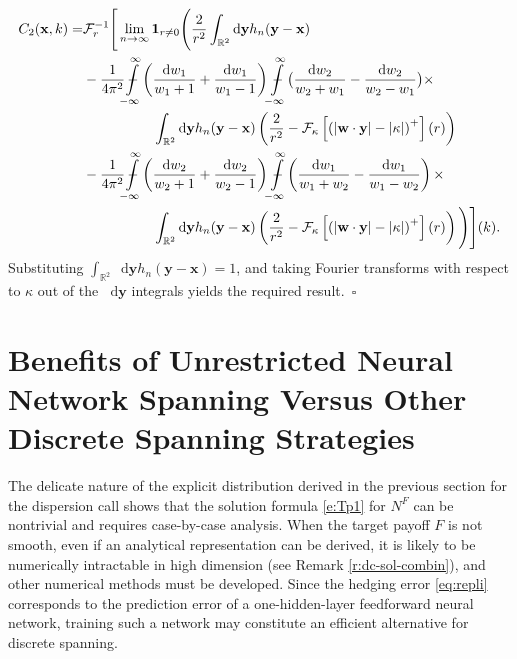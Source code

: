 \documentclass[11pt,A4,twoside]{article}
\numberwithin{equation}{section}
\renewcommand{\b}[1]{{\color{blue}#1}}
\newcommand{\intcl}{\!\!\Phint{\ \,-}\limits_{-\infty}^\infty\!}
\newcommand{\F}{\mathcal{F}}
\newcommand{\Fi}{\mathcal{F}^{-1}}
\renewcommand*\d{\mathop{}\!\mathrm{d}}
\newcommand{\x}{\mathbf{x}}
\newcommand{\y}{\mathbf{y}}
\newcommand{\w}{\mathbf{w}}
\newcommand{\R}{\mathbbm{R}}
\def\Phint#1{\mathchoice
  {\XXint\displaystyle\textstyle{#1}}%
  {\XXint\textstyle\scriptstyle{#1}}%
  {\XXint\scriptstyle\scriptscriptstyle{#1}}%
  {\XXint\scriptscriptstyle\scriptscriptstyle{#1}}%
  \!\int}
\def\XXint#1#2#3{{\setbox0=\hbox{$#1{#2#3}{\int}$}
    \vcenter{\hbox{$#2#3$}}\kern-.5\wd0}}
\def\qqq{\;\;\;\;\;\;\;\;\;}
\theoremstyle{definition}
\theoremstyle{remark}
\def\R{\mathbb{R}}
\def\finproof {$\Box$ \vskip 5 pt }\def\finproof{\rule{4pt}{6pt}}\def\finproof{\ensuremath{\square}}
\begin{document}
\begin{align*}
     C_2(\x,k) =& \Fi_r\Bigg[\lim_{n\to\infty}\mathbf{1}_{r\neq 0}\Bigg( \frac2{r^2}\int_{\R^2} \d\y h_n(\y-\x)
     \\
         &- \frac{1}{4\pi^2}\intcl \left(\frac{\d w_1}{ w_1+1}+\frac{\d w_1}{ w_1-1}\right)\intcl \big(\frac{\d w_2}{ w_2+w_1}-\frac{\d w_2}{ w_2-w_1}\big)\times\\
         &\qqq\qqq \int_{\R^2} \d\y h_n(\y-\x)\left(\frac2{r^2} - \F_\kappa\left[ \left( |\w\cdot\y| - |\kappa|\right)^+ \right](r) \right)
        \\
        &- \frac1{4\pi^2} \intcl \left(\frac{\d w_2}{ w_2+1}+\frac{\d w_2}{ w_2-1}\right)\intcl \left(\frac{\d w_1}{ w_1+w_2}-\frac{\d w_1}{ w_1-w_2}\right)\times\\
         &\qqq\qqq\int_{\R^2} \d\y h_n(\y-\x) \left(\frac2{r^2} - \F_\kappa\left[ \left( |\w\cdot\y| - |\kappa|\right)^+ \right](r) \right)
        \Bigg)\Bigg](k).
\end{align*}  
Substituting $\int_{\R^2} \d\y h_n(\y-\x) = 1$, and taking Fourier transforms with respect to $\kappa$ out of the $\d\y$ integrals yields the required result.\ \finproof\\

 
\section{Benefits of Unrestricted Neural Network Spanning Versus Other Discrete
Spanning Strategies} \label{sec:benefits}
\def\theNN{G}\def\theNN{\widetilde{F}}

The delicate nature of the explicit distribution derived in the previous section for the dispersion call 
shows that the solution formula \eqref{e:Tp1} for $N^F$ can be nontrivial and requires case-by-case analysis.  
When the target payoff $F$ is not smooth, even if an analytical representation can be derived,  it is likely to be numerically intractable in high dimension (see Remark \ref{r:dc-sol-combin}), and other numerical methods must be developed.  Since the hedging error \eqref{eq:repli} corresponds to the prediction error of a one-hidden-layer feedforward neural network, training such a network may constitute an efficient alternative for discrete spanning.
\end{document}
